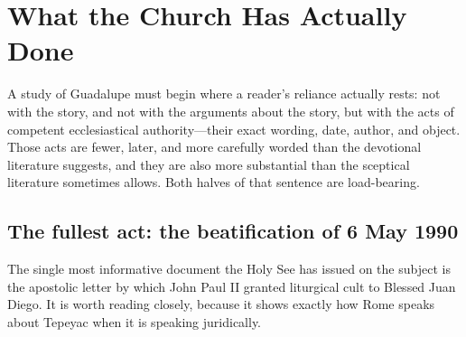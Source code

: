 \section{What the Church Has Actually Done}

A study of Guadalupe must begin where a reader's reliance actually
rests: not with the story, and not with the arguments about the story,
but with the acts of competent ecclesiastical authority---their exact
wording, date, author, and object. Those acts are fewer, later, and
more carefully worded than the devotional literature suggests, and
they are also more substantial than the sceptical literature
sometimes allows. Both halves of that sentence are load-bearing.

\subsection{The fullest act: the beatification of 6 May 1990}

The single most informative document the Holy See has issued on the
subject is the apostolic letter by which John Paul II granted
liturgical cult to Blessed Juan Diego. It is worth reading closely,
because it shows exactly how Rome speaks about Tepeyac when it is
speaking juridically.

